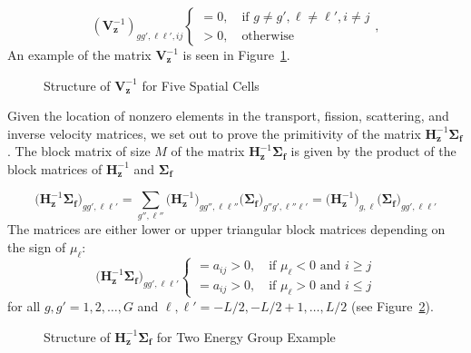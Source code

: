 \begin{equation}
		(\mathbf{V}_{\mathbf{z}}^{-1})_{gg',\ell \ell', ij}
	\begin{cases}
 		= 0, \quad \text{if } g \neq g', \ell \neq \ell', i \neq j \\
		> 0, \quad \text{otherwise}
	\end{cases},
\end{equation}
An example of the matrix $\mathbf{V}_{\mathbf{z}}^{-1}$ is seen in Figure~\ref{fig:iVz}.

\begin{figure}[!htbp]
	\centering
	\resizebox{0.75\textwidth}{!}{}
	\caption{Structure of $\mathbf{V}_{\mathbf{z}}^{-1}$ for Five Spatial Cells}\label{fig:iVz}
\end{figure}

Given the location of nonzero elements in the transport, fission, scattering, and inverse velocity matrices, we set out to prove the primitivity of the matrix $\mathbf{H}_\mathbf{z}^{-1}\mathbf{\Sigma_{f}}$. The block matrix of size $M$ of the matrix $ \mathbf{H}_{\mathbf{z}}^{-1} \mathbf{\Sigma_{f}}$ is given by the product of the block matrices of $\mathbf{H}_{\mathbf{z}}^{-1}$ and $\mathbf{\Sigma_{f}}$

\begin{equation}
	\big ( \mathbf{H}_{\mathbf{z}}^{-1} \mathbf{\Sigma_{f}} \big )_{gg',\ell\ell'} = \sum_{g'',\ell''} \big (\mathbf{H}_{\mathbf{z}}^{-1} \big )_{gg'',\ell \ell''}  \big (\mathbf{\Sigma_{f}} \big)_{g''g',\ell'' \ell'} = \big ( \mathbf{H}_{\mathbf{z}}^{-1} \big )_{g,\ell} \big ( \mathbf{\Sigma_{f}} \big )_{gg',\ell \ell'}
 \end{equation}
The matrices are either lower or upper triangular block matrices depending on the sign of $\mu_{\ell}$:
\begin{equation}
		\big ( \mathbf{H}_{\mathbf{z}}^{-1} \mathbf{\Sigma_{f}} \big )_{gg',\ell \ell'}
	\begin{cases}
 		= a_{ij} > 0, \quad \text{if } \mu_{\ell} < 0 \text{ and } i \geq j \\
 		= a_{ij} > 0, \quad \text{if } \mu_{\ell} > 0 \text{ and } i \leq j
	\end{cases}
\end{equation}
for all $g, g' = 1, 2, \dots, G$ and $\ell, \ell' = -L/2, -L/2+1, \dots, L/2$ (see Figure~\ref{fig:iHF}). 

\clearpage

\begin{figure}[!htbp]
	\centering
	\resizebox{0.75\textwidth}{!}{}
	\caption{Structure of $\mathbf{H}_{\mathbf{z}}^{-1}\mathbf{\Sigma_{f}}$ for Two Energy Group Example}\label{fig:iHF}
\end{figure}

